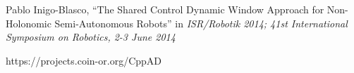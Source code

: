\documentclass[a4paper,10pt]{article}
\begin{document}
\begin{thebibliography}{1}

 Pablo Inigo-Blasco, ``The Shared Control Dynamic Window Approach for Non-Holonomic Semi-Autonomous Robots'' in \emph{ISR/Robotik 2014; 41st International Symposium on Robotics, 2-3 June 2014} 

 https://projects.coin-or.org/CppAD

\end{thebibliography}
\end{document}
